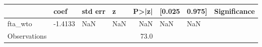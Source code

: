 \begin{tabular}{llllrlll}
\toprule
{} &     coef & std err &    z &  P>|z| & [0.025 & 0.975] & Significance \\
\midrule
fta\_wto      &  -1.4133 &     NaN &  NaN &    NaN &    NaN &    NaN &              \\
Observations &          &         &      &   73.0 &        &        &              \\
\bottomrule
\end{tabular}
